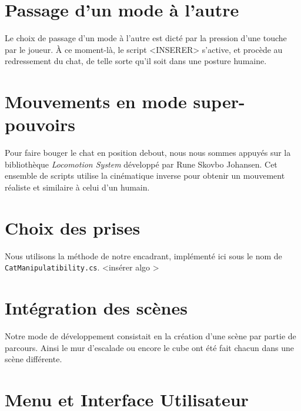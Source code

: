 \documentclass[a4paper,11pt]{article}
\begin{document}
\section{Passage d'un mode à l’autre}
Le choix de passage d'un mode à l'autre est dicté par la pression d'une touche par le joueur. À ce moment-là, le script <INSERER> s'active, et procède au redressement du chat, de telle sorte qu'il soit dans une posture humaine. 

\section{Mouvements en mode super-pouvoirs}
Pour faire bouger le chat en position debout, nous nous sommes appuyés sur la bibliothèque \textit{Locomotion System} développé par Rune Skovbo Johansen. Cet ensemble de scripts utilise la cinématique inverse pour obtenir un mouvement réaliste et similaire à celui d'un humain.

\section{Choix des prises}
Nous utilisons la méthode de notre encadrant, implémenté ici sous le nom de \texttt{CatManipulatibility.cs}.
<insérer algo >

\section{Intégration des scènes}
Notre mode de développement consistait en la création d’une scène par partie de parcours. Ainsi le mur d’escalade ou encore le cube ont été fait chacun dans une scène différente. 

\section{Menu et Interface Utilisateur}


\end{document}
